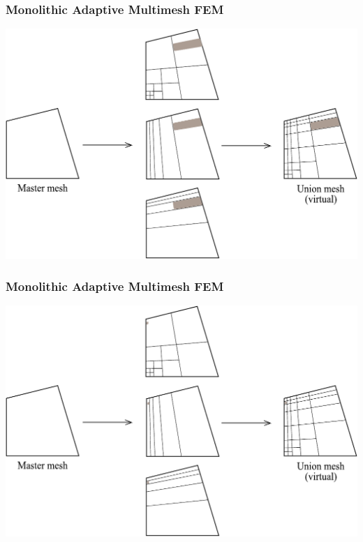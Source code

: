 \begin{frame}
  \frametitle{Monolithic Adaptive Multimesh FEM}
  \begin{center}
    \includegraphics[height=0.7\textheight]{multimesh/mm_24.pdf}
  \end{center}
\end{frame}

\begin{frame}
  \frametitle{Monolithic Adaptive Multimesh FEM}
  \begin{center}
    \includegraphics[height=0.7\textheight]{multimesh/mm_25.pdf}
  \end{center}
\end{frame}

